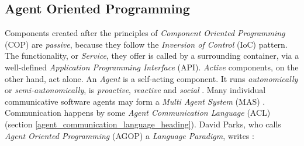 %
%
%
%
%
%
%

\subsection{Agent Oriented Programming}
\label{agent_oriented_programming_heading}

Components created after the principles of \emph{Component Oriented Programming}
(COP) are \emph{passive}, because they follow the \emph{Inversion of Control}
(IoC) pattern. The functionality, or \emph{Service}, they offer is called by a
surrounding container, via a well-defined \emph{Application Programming Interface}
(API). \emph{Active} components, on the other hand, act alone. An \emph{Agent}
is a self-acting component. It runs \emph{autonomically} or
\emph{semi-autonomically}, is \emph{proactive}, \emph{reactive} and
\emph{social} \cite[p. 330]{sowa}. Many individual communicative software
agents may form a \emph{Multi Agent System} (MAS) \cite{wikipedia}.
Communication happens by some \emph{Agent Communication Language} (ACL)
(section \ref{agent_communication_language_heading}). David Parks, who calls
\emph{Agent Oriented Programming} (AGOP) a \emph{Language Paradigm}, writes
\cite{parks}:

